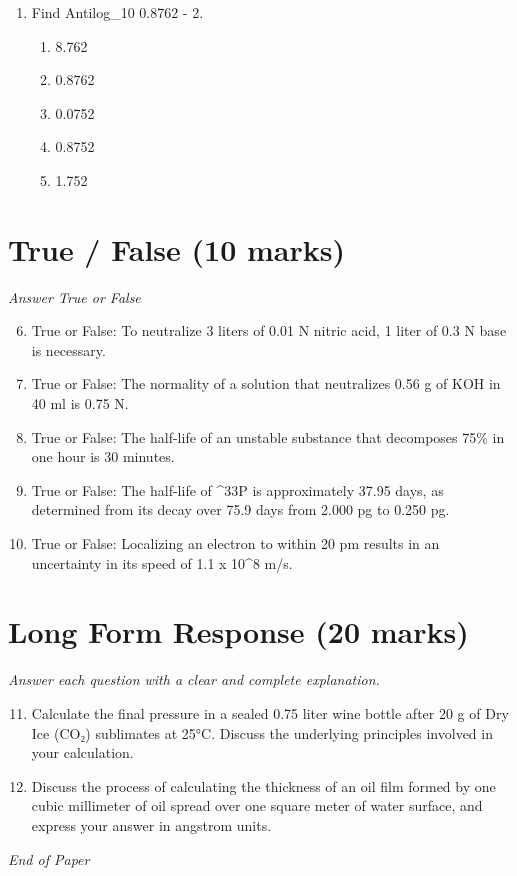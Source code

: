 \documentclass[12pt]{article}
\begin{document}
\begin{enumerate}[label=\arabic*.]
\begin{enumerate}[label=(\alph*)]
    \item SnF\_5, PH\_3, SiO\_3
    \item SnF, PH\_4, SiO
    \item SnF\_2, PH\_2, SiO
    \item SnF\_6, PH\_3, SiO\_2
\end{enumerate}
\item Find Antilog\_10 0.8762 - 2.
\begin{enumerate}[label=(\alph*)]
    \item 8.762
    \item 0.8762
    \item 0.0752
    \item 0.8752
    \item 1.752
\end{enumerate}
\end{enumerate}

\section*{True / False (10 marks)}
\textit{Answer True or False}
\begin{enumerate}[label=\arabic*.]
\setcounter{enumi}{5}
\item True or False: To neutralize 3 liters of 0.01 N nitric acid, 1 liter of 0.3 N base is necessary.
\item True or False: The normality of a solution that neutralizes 0.56 g of KOH in 40 ml is 0.75 N.
\item True or False: The half-life of an unstable substance that decomposes 75\% in one hour is 30 minutes.
\item True or False: The half-life of \^{}33P is approximately 37.95 days, as determined from its decay over 75.9 days from 2.000 pg to 0.250 pg.
\item True or False: Localizing an electron to within 20 pm results in an uncertainty in its speed of 1.1 x 10\^{}8 m/s.
\end{enumerate}

\section*{Long Form Response (20 marks)}
\textit{Answer each question with a clear and complete explanation.}
\begin{enumerate}[label=\arabic*.]
\setcounter{enumi}{10}
\item Calculate the final pressure in a sealed 0.75 liter wine bottle after 20 g of Dry Ice
(CO₂) sublimates at 25°C. Discuss the underlying principles involved in your calculation.
\item Discuss the process of calculating the thickness of an oil film formed by one cubic
millimeter of oil spread over one square meter of water surface, and express your answer
in angstrom units.
\end{enumerate}

\vfill
\noindent\textit{End of Paper}
\end{document}
